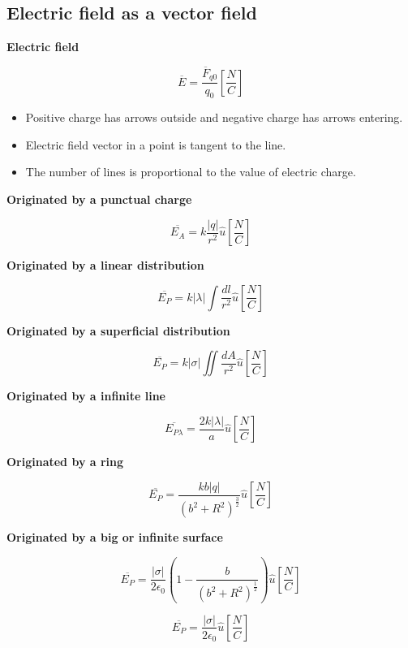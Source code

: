 \documentclass[letterpaper]{article}
\newcommand{\divline}{\noindent\makebox[\linewidth]{\rule{\textwidth}{0.4pt}}}
\begin{document}
    \divline
    \begin{multicols}{3}
        \section{Electric field as a vector field}
        
        \textbf{Electric field}

        \[\overline{E} = \frac{\overline{F}_{q0}}{q_{0}} \left[ \frac{N}{C} \right] \]

        \begin{itemize}
            \item Positive charge has arrows outside and negative charge has arrows entering.
            \item Electric field vector in a point is tangent to the line.
            \item The number of lines is proportional to the value of electric charge.
        \end{itemize}
        
        \textbf{Originated by a punctual charge}

        \[\overline{E_{A}} = k \frac{|q|}{r^{2}} \hat{u}  \left[ \frac{N}{C} \right] \]

        \textbf{Originated by a linear distribution}

        \[\overline{E_{P}} = k |\lambda| \int \frac{dl}{r^{2}} \hat{u} \left[ \frac{N}{C} \right] \]

        \textbf{Originated by a superficial distribution}

        \[ \overline{E_{P}} = k |\sigma| \iint \frac{dA}{r^{2}} \hat{u} \left[ \frac{N}{C} \right] \]

        \textbf{Originated by a infinite line}

        \[\overline{E_{P \lambda}} = \frac{2k|\lambda|}{a} \hat{u} \left[ \frac{N}{C} \right]\]

        \textbf{Originated by a ring}

        \[ \overline{E_{P}} =  \frac{kb|q|}{(b^{2}+R^{2})^{\frac{3}{2}}}  \hat{u} \left[ \frac{N}{C} \right] \]

        \textbf{Originated by a big or infinite surface}

        \[ \overline{E_{P}} = \frac{|\sigma|}{2\epsilon_{0}} \left( 1 - \frac{b}{(b^{2} + R^{2})^{\frac{1}{2}}} \right)  \hat{u} \left[ \frac{N}{C} \right] \]

        \[ \overline{E_{P}} = \frac{|\sigma|}{2\epsilon_{0}} \hat{u} \left[ \frac{N}{C} \right] \]


\end{multicols}
\end{document}

